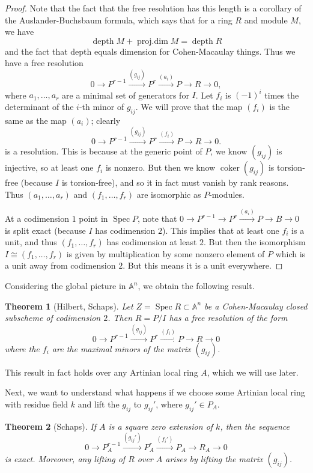 \documentclass[leqno, openany]{memoir}
\newtheorem{thm}{Theorem}[section]
\theoremstyle{definition}
\theoremstyle{remark}
\theoremstyle{plain}
\theoremstyle{definition}
\theoremstyle{remark}
\newcommand{\A}{\mathbb{A}}
\DeclareMathOperator{\Spec}{Spec}
\DeclareMathOperator{\depth}{depth}
\DeclareMathOperator{\coker}{coker}
\begin{document}
\begin{proof}
    Note that the fact that the free resolution has this length is a corollary of the Auslander-Buchsbaum formula, which says that for a ring $R$ and module $M$, we have
    \[ \depth M + \operatorname{proj.dim} M = \depth R \]
    and the fact that depth equals dimension for Cohen-Macaulay things. Thus we have a free resolution
    \[ 0 \to P^{r-1} \xrightarrow{(g_{ij})} P^r \xrightarrow{(a_i)} P \to R \to 0, \]
    where $a_1, \ldots, a_r$ are a minimal set of generators for $I$. Let $f_i$ is ${(-1)}^i$ times the determinant of the $i$-th minor of $g_{ij}$. We will prove that the map $(f_i)$ is the same as the map $(a_i)$; clearly
    \[ 0 \to P^{r-1} \xrightarrow{(g_{ij})} P^r \xrightarrow{(f_i)} P \to R \to 0. \]
    is a resolution. This is because at the generic point of $P$, we know $(g_{ij})$ is injective, so at least one $f_i$ is nonzero. But then we know $\coker (g_{ij})$ is torsion-free (because $I$ is torsion-free), and so it in fact must vanish by rank reasons. Thus $(a_1, \ldots, a_{r})$ and $(f_1, \ldots, f_{r})$ are isomorphic as $P$-modules.

    At a codimension $1$ point in $\Spec P$, note that $0 \to P^{r-1} \to P^r \xrightarrow{(a_i)} P \to B \to 0$ is split exact (because $I$ has codimension $2$). This implies that at least one $f_i$ is a unit, and thus $(f_1, \ldots, f_r)$ has codimension at least $2$. But then the isomorphism $I \cong (f_1, \ldots, f_r)$ is given by multiplication by some nonzero element of $P$ which is a unit away from codimension $2$. But this means it is a unit everywhere.
\end{proof}

Considering the global picture in $\A^n$, we obtain the following result.
\begin{thm}[Hilbert, Schaps]
    Let $Z = \Spec R \subset \A^n$ be a Cohen-Macaulay closed subscheme of codimension $2$. Then $R = P/I$ has a free resolution of the form
    \[ 0 \to P^{r-1} \xrightarrow{(g_{ij})} P^r \xrightarrow{(f_i)} P \to R \to 0 \]
    where the $f_i$ are the maximal minors of the matrix $(g_{ij})$.
\end{thm}

This result in fact holds over any Artinian local ring $A$, which we will use later.

Next, we want to understand what happens if we choose some Artinian local ring with residue field $k$ and lift the $g_{ij}$ to $g_{ij}'$, where $g_{ij}' \in P_A$.

\begin{thm}[Schaps]
    If $A$ is a square zero extension of $k$, then the sequence
    \[ 0 \to P_A^{r-1} \xrightarrow{(g_{ij}')} P_A^r \xrightarrow{(f_i')} P_A \to R_A \to 0 \]
    is exact. Moreover, any lifting of $R$ over $A$ arises by lifting the matrix $(g_{ij})$.
\end{thm}
\end{document}
